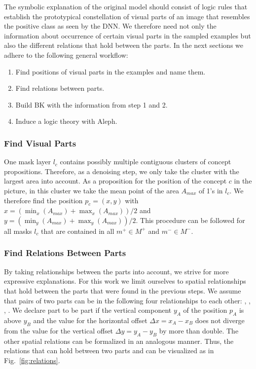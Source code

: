 The symbolic explanation of the original model should consist of logic
rules that establish the prototypical constellation of visual parts of
an image that resembles the positive class as seen by the DNN. We
therefore need not only the information about occurrence of certain
visual parts in the sampled examples but also the different relations
that hold between the parts. In the next sections we adhere to the
following general workflow:

\begin{enumerate}
\item Find positions of visual parts in the examples and name them.
\item Find relations between parts.
\item Build BK with the information from step 1 and 2.
\item Induce a logic theory with Aleph.
\end{enumerate}


\subsubsection{Find Visual Parts}

One mask layer $l_c$ contains possibly multiple contiguous clusters of
concept propositions. Therefore, as a denoising step, we only take the
cluster with the largest area into account. As a proposition for the
position of the concept $c$ in the picture, in this cluster we take
the mean point of the area $A_{max}$ of 1's in $l_c$. We therefore
find the position $p_c = (x, y)$ with $x = (\min_x(A_{max}) +
\max_x(A_{max})) / 2$ and $y = (\min_y(A_{max}) + \max_y(A_{max})) / 2$.
This procedure can be followed for all masks $l_c$ that are
contained in all $m^+ \in M^+$ and $m^- \in M^-$.


\subsubsection{Find Relations Between Parts}

By taking relationships between the parts into account, we strive for
more expressive explanations. For this work we limit ourselves to
spatial relationships that hold between the parts that were found in
the previous steps. We assume that pairs of two parts can be in the
following four relationships to each other: ,
, , . We
declare part  to be  part  if
the vertical component $y_A$ of the position $p_A$ is above $y_B$ and
the value for the horizontal offset $\Delta x = x_A - x_B$ does not
diverge from the value for the vertical offset $\Delta y = y_A - y_B$
by more than double. The other spatial relations can be formalized in
an analogous manner. Thus, the relations that can hold between two
parts  and  can be visualized as in
Fig.~\ref{fig:relations}.

